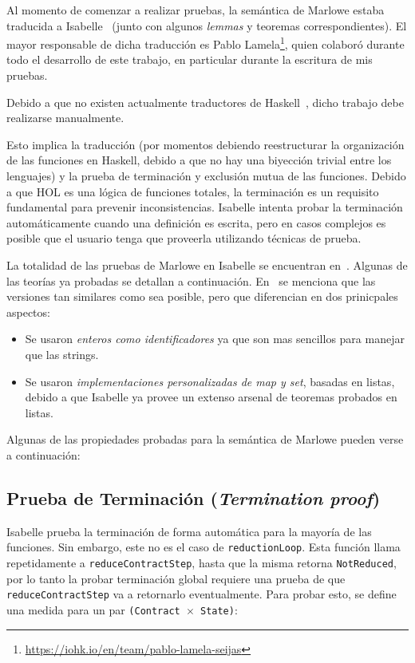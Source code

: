 \documentclass[12pt]{book}
\begin{document}
Al momento de comenzar a realizar pruebas, la semántica de Marlowe estaba traducida a Isabelle~\cite{implementing_financial_contracts_on_blockchain, efficient-static-analysis-marlowe-isabelle} (junto con algunos \textit{lemmas} y teoremas correspondientes). El mayor responsable de dicha traducción es Pablo Lamela\footnote{\url{https://iohk.io/en/team/pablo-lamela-seijas}}, quien colaboró durante todo el desarrollo de este trabajo, en particular durante la escritura de mis pruebas.

Debido a que no existen actualmente traductores de Haskell~\cite{translating-haskell-to-isabelle}, dicho trabajo debe realizarse manualmente. 

Esto implica la traducción (por momentos debiendo reestructurar la organización de las funciones en Haskell, debido a que no hay una biyección trivial entre los lenguajes) y la prueba de terminación y exclusión mutua de las funciones. Debido a que HOL es una lógica de funciones totales, la terminación es un requisito fundamental para prevenir inconsistencias. Isabelle intenta probar la terminación automáticamente cuando una definición es escrita, pero en casos complejos es posible que el usuario tenga que proveerla utilizando técnicas de prueba.

La totalidad de las pruebas de Marlowe en Isabelle se encuentran en~\cite{marlowe-isabelle-repo}. Algunas de las teorías ya probadas se detallan a continuación. En~\cite{implementing_financial_contracts_on_blockchain} se menciona que las versiones tan similares como sea posible, pero que diferencian en dos prinicpales aspectos:

\begin{itemize}
    \item Se usaron \textit{enteros como identificadores} ya que son mas sencillos para manejar que las strings.
    \item Se usaron \textit{implementaciones personalizadas de map y set}, basadas en listas, debido a que Isabelle ya provee un extenso arsenal de teoremas probados en listas.
\end{itemize}

Algunas de las propiedades probadas para la semántica de Marlowe pueden verse a continuación:

\subsection{Prueba de Terminación (\textit{Termination proof})}
Isabelle prueba la terminación de forma automática para la mayoría de las funciones. Sin embargo, este no es el caso de \texttt{reductionLoop}. Esta función llama repetidamente a \texttt{reduceContractStep}, hasta que la misma retorna \texttt{NotReduced}, por lo tanto la probar terminación global requiere una prueba de que \texttt{reduceContractStep} va a retornarlo eventualmente. Para probar esto, se define una medida para un par \texttt{(Contract $\times$ State)}:
\end{document}
